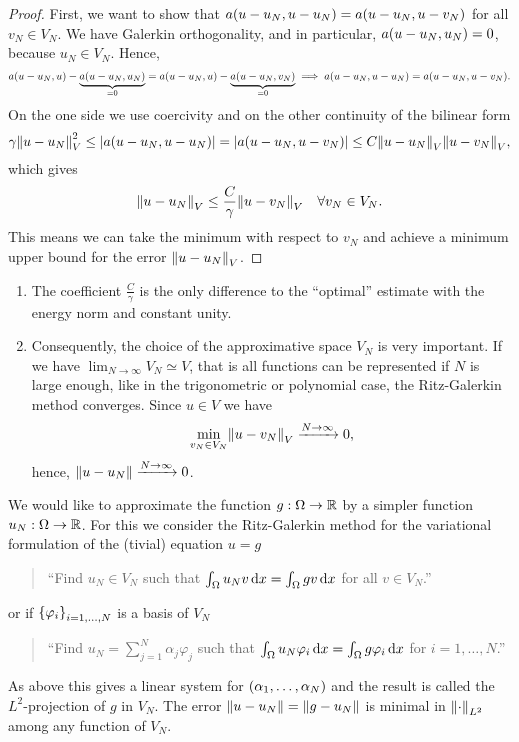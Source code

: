 \begin{proof}
    First, we want to show that \(a\parentheses*{u - u_N, u - u_N} = a\parentheses*{u - u_N, u - v_N}\) for all \(v_N \in V_N\).
    We have Galerkin orthogonality, and in particular, \(a\parentheses*{u - u_N, u_N} = 0\), because \(u_N \in V_N\).
    Hence,
    \[
        a\parentheses*{u - u_N, u} - \underbrace{a\parentheses*{u - u_N, u_N}}_{= 0} = a\parentheses*{u - u_N, u} - \underbrace{a\parentheses*{u - u_N, v_N}}_{= 0} \implies a\parentheses*{u - u_N, u - u_N} = a\parentheses*{u - u_N, u - v_N}.
    \]
    On the one side we use coercivity and on the other continuity of the bilinear form
    \[
        \gamma\norm*{u - u_N}_V^2 \le \absolute*{a\parentheses*{u - u_N, u - u_N}} = \absolute*{a\parentheses*{u - u_N, u - v_N}} \le C\norm*{u - u_N}_V \norm*{u - v_N}_V,
    \]
    which gives
    \[
        \norm*{u - u_N}_V \le \frac{C}{\gamma}\norm*{u - v_N}_V \quad \forall v_N \in V_N.
    \]
    This means we can take the minimum with respect to \(v_N\) and achieve a minimum upper bound for the error \(\norm*{u - u_N}_V\).
\end{proof}

\begin{remark}
    \begin{enumerate}
        \item The coefficient \(\frac{C}{\gamma}\) is the only difference to the ``optimal'' estimate with the energy norm and constant unity.
        \item Consequently, the choice of the approximative space \(V_N\) is very important.
        If we have \(\lim_{N \to \infty}V_N \simeq V\), that is all functions can be represented if \(N\) is large enough, like in the trigonometric or polynomial case, the Ritz-Galerkin method converges.
        Since \(u \in V\) we have
        \[
            \min_{v_N \in V_N}\norm*{u - v_N}_V \xrightarrow{N \to \infty} 0,
        \]
        hence, \(\norm*{u - u_N} \xrightarrow{N \to \infty} 0\).
    \end{enumerate}
\end{remark}

\begin{example}
    We would like to approximate the function \(g: \Omega \to \R\) by a simpler function \(u_N: \Omega \to \R\).
    For this we consider the Ritz-Galerkin method for the variational formulation of the (tivial) equation \(u = g\)
    \begin{quote}
        ``Find \(u_N \in V_N\) such that \(\int_\Omega u_N v\d x = \int_\Omega gv\d x\) for all \(v \in V_N\).''
    \end{quote}
    or if \(\braces*{\varphi_i}_{i = 1, \ldots, N}\) is a basis of \(V_N\)
    \begin{quote}
        ``Find \(u_N = \sum_{j = 1}^N \alpha_j \varphi_j\) such that \(\int_\Omega u_N \varphi_i \d x = \int_\Omega g\varphi_i \d x\) for \(i = 1, \ldots, N\).''
    \end{quote}
    As above this gives a linear system for \(\parentheses*{\alpha_1, \ldots, \alpha_N}\) and the result is called the \(L^2\)-projection of \(g\) in \(V_N\).
    The error \(\norm*{u - u_N} = \norm*{g - u_N}\) is minimal in \(\norm*{\cdot}_{L^2}\) among any function of \(V_N\).
\end{example}
